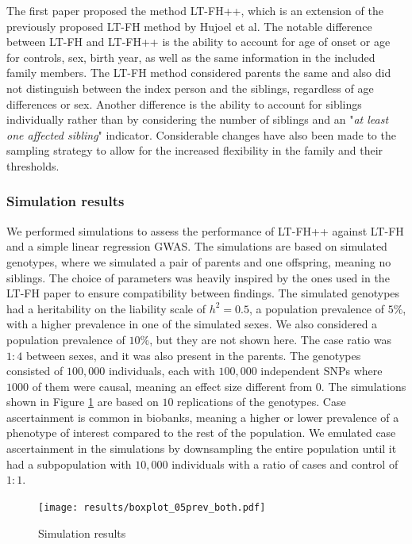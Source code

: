 The first paper proposed the method LT-FH++, which is an extension of the previously proposed LT-FH method by Hujoel et al\cite{hujoel2020liability}. The notable difference between LT-FH and LT-FH++ is the ability to account for age of onset or age for controls, sex, birth year, as well as the same information in the included family members. The LT-FH method considered parents the same and also did not distinguish between  the index person and the siblings, regardless of age differences or sex. Another difference is the ability to account for siblings individually rather than by considering the number of siblings and an "\textit{at least one affected sibling}" indicator. Considerable changes have also been made to the sampling strategy to allow for the increased flexibility in the family and their thresholds.

\subsubsection{Simulation results}
We performed simulations to assess the performance of LT-FH++ against LT-FH and a simple linear regression GWAS. The simulations are based on simulated genotypes, where we simulated a pair of parents and one offspring, meaning no siblings. The choice of parameters was heavily inspired by the ones used in the LT-FH paper to ensure compatibility between findings. The simulated genotypes had a heritability on the liability scale of $ h^2 = 0.5 $, a population prevalence of $ 5\% $, with a higher prevalence in one of the simulated sexes. We also considered a population prevalence of $ 10\% $, but they are not shown here. The case ratio was $ 1:4 $ between sexes, and it was also present in the parents. The genotypes consisted of $ 100,000 $ individuals, each with $ 100,000 $ independent SNPs where $ 1000 $ of them were causal, meaning an effect size different from $ 0 $. The simulations shown in Figure \ref{fig:LTFH++_simulation_results} are based on $ 10 $ replications of the genotypes. Case ascertainment is common in biobanks, meaning a higher or lower prevalence of a phenotype of interest compared to the rest of the population. We emulated case ascertainment in the simulations by downsampling the entire population until it had a subpopulation with $ 10,000 $ individuals with a ratio of cases and control of $ 1:1 $.
\begin{figure}[h]
	\label{fig:LTFH++_simulation_results}
	\caption{Simulation results}
	\texttt{[image: results/boxplot\_05prev\_both.pdf]}
\end{figure}

